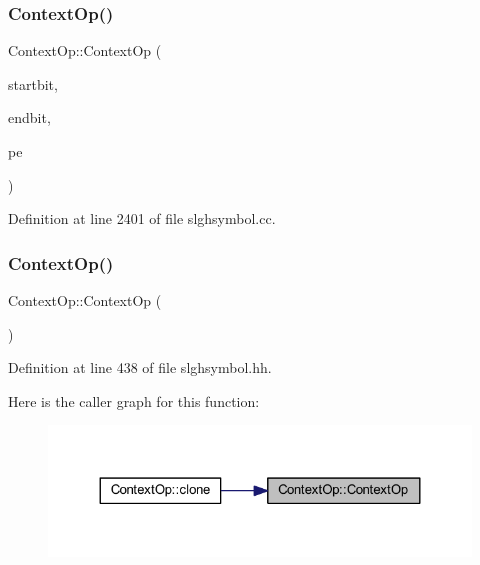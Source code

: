 \subsubsection{\texorpdfstring{ContextOp()}{ContextOp()}\hspace{0.1cm}{\footnotesize\ttfamily [1/2]}}
{\footnotesize\ttfamily Context\+Op\+::\+Context\+Op (\begin{DoxyParamCaption}\item[{int4}]{startbit,  }\item[{int4}]{endbit,  }\item[{\mbox{\hyperlink{class_pattern_expression}{Pattern\+Expression}} $\ast$}]{pe }\end{DoxyParamCaption})}



Definition at line 2401 of file slghsymbol.\+cc.

\mbox{\label{class_context_op_a67722af7a45f6c17e1a67b671d2c75b7}} 
\subsubsection{\texorpdfstring{ContextOp()}{ContextOp()}\hspace{0.1cm}{\footnotesize\ttfamily [2/2]}}
{\footnotesize\ttfamily Context\+Op\+::\+Context\+Op (\begin{DoxyParamCaption}\item[{void}]{ }\end{DoxyParamCaption})\hspace{0.3cm}{\ttfamily [inline]}}



Definition at line 438 of file slghsymbol.\+hh.

Here is the caller graph for this function\+:
\nopagebreak
\begin{figure}[H]
\begin{center}
\leavevmode
\includegraphics[width=324pt]{class_context_op_a67722af7a45f6c17e1a67b671d2c75b7_icgraph}
\end{center}
\end{figure}
\mbox{\label{class_context_op_a858cd3ce5a361498e72e77149fc110e5}} 
